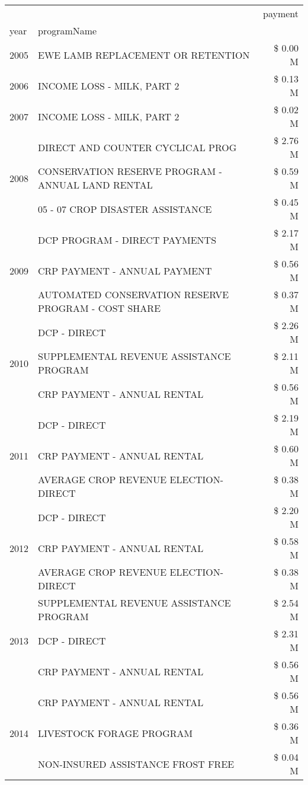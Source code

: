\begin{tabular}{llr}
\toprule
 &  & payment \\
year & programName &  \\
\midrule
2005 & EWE LAMB REPLACEMENT OR RETENTION & \$ 0.00 M \\
\cline{1-3}
2006 & INCOME LOSS - MILK, PART 2 & \$ 0.13 M \\
\cline{1-3}
2007 & INCOME LOSS - MILK, PART 2 & \$ 0.02 M \\
\cline{1-3}
\multirow[t]{3}{*}{2008} & DIRECT AND COUNTER CYCLICAL PROG & \$ 2.76 M \\
 & CONSERVATION RESERVE PROGRAM - ANNUAL LAND RENTAL & \$ 0.59 M \\
 & 05 - 07 CROP DISASTER ASSISTANCE & \$ 0.45 M \\
\cline{1-3}
\multirow[t]{3}{*}{2009} & DCP PROGRAM - DIRECT PAYMENTS & \$ 2.17 M \\
 & CRP PAYMENT - ANNUAL PAYMENT & \$ 0.56 M \\
 & AUTOMATED CONSERVATION RESERVE PROGRAM - COST SHARE & \$ 0.37 M \\
\cline{1-3}
\multirow[t]{3}{*}{2010} & DCP - DIRECT & \$ 2.26 M \\
 & SUPPLEMENTAL REVENUE ASSISTANCE PROGRAM & \$ 2.11 M \\
 & CRP PAYMENT - ANNUAL RENTAL & \$ 0.56 M \\
\cline{1-3}
\multirow[t]{3}{*}{2011} & DCP - DIRECT & \$ 2.19 M \\
 & CRP PAYMENT - ANNUAL RENTAL & \$ 0.60 M \\
 & AVERAGE CROP REVENUE ELECTION-DIRECT & \$ 0.38 M \\
\cline{1-3}
\multirow[t]{3}{*}{2012} & DCP - DIRECT & \$ 2.20 M \\
 & CRP PAYMENT - ANNUAL RENTAL & \$ 0.58 M \\
 & AVERAGE CROP REVENUE ELECTION-DIRECT & \$ 0.38 M \\
\cline{1-3}
\multirow[t]{3}{*}{2013} & SUPPLEMENTAL REVENUE ASSISTANCE PROGRAM & \$ 2.54 M \\
 & DCP - DIRECT & \$ 2.31 M \\
 & CRP PAYMENT - ANNUAL RENTAL & \$ 0.56 M \\
\cline{1-3}
\multirow[t]{3}{*}{2014} & CRP PAYMENT - ANNUAL RENTAL & \$ 0.56 M \\
 & LIVESTOCK FORAGE PROGRAM & \$ 0.36 M \\
 & NON-INSURED ASSISTANCE FROST FREE & \$ 0.04 M \\

\end{tabular}
